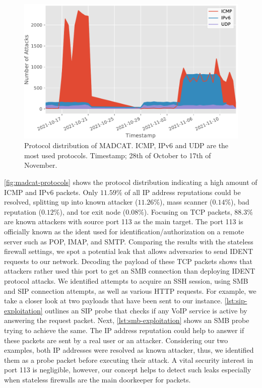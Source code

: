 \begin{figure}[ht]
    \centering
    \includegraphics[width=\textwidth]{figures/madcat-protocol-usage.pdf}
    \caption[Protocol distribution of MADCAT]{
        Protocol distribution of MADCAT. ICMP, IPv6 and UDP are the most used protocols.
        Timestamp; 28th of October to 17th of November.
    }
    \label{fig:madcat-protocols}
\end{figure}

\autoref{fig:madcat-protocols} shows the protocol distribution indicating a high amount of ICMP and IPv6 packets.
Only $11.59\%$ of all IP address reputations could be resolved, splitting up into known attacker ($11.26\%$), mass scanner ($0.14\%$), bad reputation ($0.12\%$), and tor exit node ($0.08\%$).
Focusing on TCP packets, $88.3\%$ are known attackers with source port 113 as the main target.
The port 113 is officially known as the \ac{ident}\cite{rfc1413} used for identification/authorization on a remote server such as POP, IMAP, and SMTP.
Comparing the results with the stateless firewall settings, we spot a potential leak that allows adversaries to send IDENT requests to our network.
Decoding the payload of these TCP packets shows that attackers rather used this port to get an SMB connection than deploying IDENT protocol attacks.
We identified attempts to acquire an SSH session, using SMB and SIP connection attempts, as well as various HTTP requests.
For example, we take a closer look at two payloads that have been sent to our instance.
\autoref{lst:sip-exploitation} outlines an SIP probe that checks if any VoIP service is active by answering the request packet.
Next, \autoref{lst:smb-exploitation} shows an SMB probe trying to achieve the same.
The IP address reputation could help to answer if these packets are sent by a real user or an attacker.
Considering our two examples, both IP addresses were resolved as known attacker, thus, we identified them as a probe packet before executing their attack.
A vital security interest in port 113 is negligible, however, our concept helps to detect such leaks especially when stateless firewalls are the main doorkeeper for packets.

